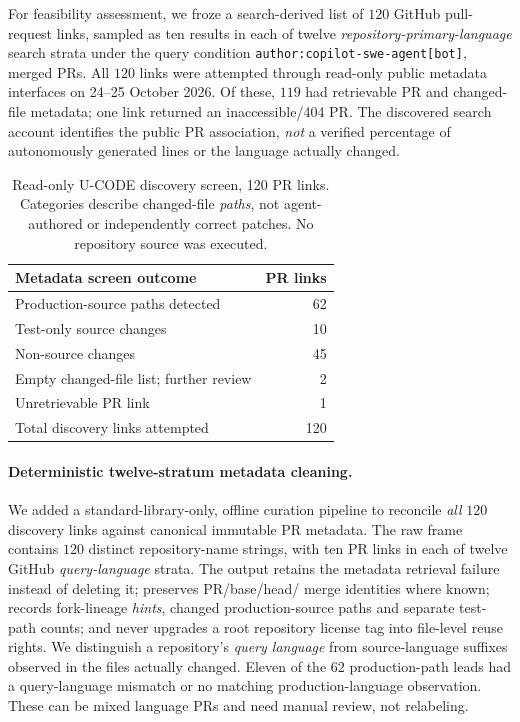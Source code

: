\documentclass[pdflatex,sn-basic]{sn-jnl}
\begin{document}
For feasibility assessment, we froze a search-derived list of
$120$ GitHub pull-request links, sampled as ten results in
each of twelve \emph{repository-primary-language} search
strata under the query condition
\texttt{author:copilot-swe-agent[bot]}, merged PRs.
All $120$ links were attempted through read-only public
metadata interfaces on 24--25 October 2026. Of these,
$119$ had retrievable PR and changed-file metadata;
one link returned an inaccessible/404 PR. The discovered
search account identifies the public PR association,
\emph{not} a verified percentage of autonomously
generated lines or the language actually changed.

\begin{table}[t]
\centering
\caption{Read-only U-CODE discovery screen, 120 PR links.
Categories describe changed-file \emph{paths}, not
agent-authored or independently correct patches.
No repository source was executed.}
\label{tab:pr-screen}
\begin{tabular}{lr}
\toprule
Metadata screen outcome & PR links\\
\midrule
Production-source paths detected & 62\\
Test-only source changes & 10\\
Non-source changes & 45\\
Empty changed-file list; further review & 2\\
Unretrievable PR link & 1\\
\midrule
Total discovery links attempted & 120\\
\bottomrule
\end{tabular}
\end{table}

\paragraph{Deterministic twelve-stratum metadata cleaning.}
We added a standard-library-only, offline curation
pipeline to reconcile \emph{all} $120$ discovery links
against canonical immutable PR metadata. The raw frame
contains $120$ distinct repository-name strings, with
ten PR links in each of twelve GitHub \emph{query-language}
strata. The output retains the metadata retrieval
failure instead of deleting it; preserves PR/base/head/
merge identities where known; records fork-lineage
\emph{hints}, changed production-source paths and
separate test-path counts; and never upgrades a
root repository license tag into file-level reuse rights.
We distinguish a repository's \emph{query language}
from source-language suffixes observed in the files
actually changed. Eleven of the $62$ production-path
leads had a query-language mismatch or no matching
production-language observation. These can be mixed
language PRs and need manual review, not relabeling.
\end{document}
